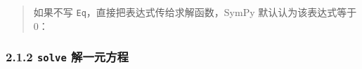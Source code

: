 \begin{Shaded}
\begin{Highlighting}[]
\end{Highlighting}
\end{Shaded}

\begin{quote}
如果不写 \texttt{Eq}，直接把表达式传给求解函数，SymPy
默认认为该表达式等于 0：
\end{quote}

\begin{Shaded}
\begin{Highlighting}[]
\OperatorTok{=}\NormalTok{)}
\OperatorTok{**} \OperatorTok{{-}} 
\end{Highlighting}
\end{Shaded}

\begin{Shaded}
\begin{Highlighting}[]
\end{Highlighting}
\end{Shaded}

\subsubsection{\texorpdfstring{2.1.2 \texttt{solve}
解一元方程}{2.1.2 solve 解一元方程}}\label{solve-ux89e3ux4e00ux5143ux65b9ux7a0b}

\begin{Shaded}
\begin{Highlighting}[]
\OperatorTok{=}\NormalTok{)}
\OperatorTok{*}\OperatorTok{+}  \OperatorTok{{-}} 
\OperatorTok{**} \OperatorTok{+} \OperatorTok{*}\OperatorTok{+} 
\end{Highlighting}
\end{Shaded}

\begin{Shaded}
\begin{Highlighting}[]
\NormalTok{[2]}
\NormalTok{[{-}4, {-}1]}
\end{Highlighting}
\end{Shaded}

